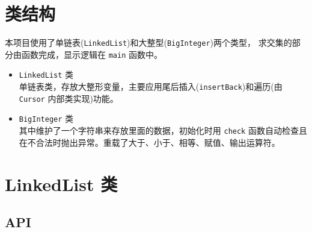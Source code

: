 
\chapter{类结构}
本项目使用了{\kaishu 单链表(\lstinline{LinkedList})}和{\kaishu 大整型(\lstinline{BigInteger})}两个类型，%
求交集的部分由函数完成，显示逻辑在 \lstinline{main} 函数中。

\begin{itemize}
    \item \lstinline{LinkedList} 类\\
    单链表类，存放大整形变量，主要应用{\kaishu 尾后插入(\lstinline{insertBack})}和{\kaishu 遍历(由 \lstinline{Cursor} 内部类实现)}功能。
    \item \lstinline{BigInteger} 类\\
    其中维护了一个字符串来存放里面的数据，初始化时用 \lstinline{check} 函数自动检查且在不合法时抛出异常。重载了大于、小于、相等、赋值、输出运算符。
\end{itemize}


\chapter{LinkedList 类}

\section{API}

